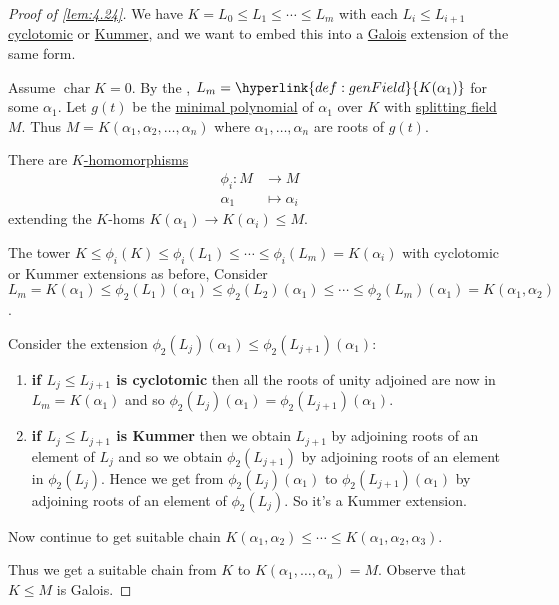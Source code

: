 \documentclass{article}
\DeclareMathOperator{\chara}{char}
\begin{document}
\begin{proof}[Proof of \cref{lem:4.24}]
    We have $K = L_0 \leq L_1 \leq \dotsb \leq L_m$ with each $L_i \leq L_{i+1}$ \hyperlink{def:cycloExt}{cyclotomic} or \hyperlink{def:kummerExt}{Kummer},
    and we want to embed this into a \hyperlink{def:galoisExt}{Galois} extension of the same form.

    Assume $\chara K = 0$. By the , $L_m = \hyperlink{def:genField}{K(\alpha_1)}$ for some $\alpha_1$.
    Let $g(t)$ be the \hyperlink{def:minimalPoly}{minimal polynomial} of $\alpha_1$ over $K$ with \hyperlink{def:splitting}{splitting field} $M$.
    Thus $M = K(\alpha_1,\alpha_2,\dotsc,\alpha_n)$ where $\alpha_1, \dotsc, \alpha_n$ are roots of $g(t)$.

    There are \hyperlink{def:homo}{$K$-homomorphisms}
    \begin{align*}
        \phi_i : M &\longrightarrow M \\
        \alpha_1 &\longmapsto \alpha_i
    \end{align*}
    extending the $K$-homs $K(\alpha_1) \to K(\alpha_i) \leq M$.

    The tower $K \leq \phi_i(K) \leq \phi_i(L_1) \leq \dotsb \leq \phi_i(L_m) = K(\alpha_i)$ with cyclotomic or Kummer extensions as before,
    Consider $L_m = K(\alpha_1) \leq \phi_2(L_1)(\alpha_1) \leq \phi_2(L_2)(\alpha_1) \leq \dotsb \leq \phi_2(L_m)(\alpha_1) = K(\alpha_1,\alpha_2)$.

    Consider the extension $\phi_2(L_j)(\alpha_1) \leq \phi_2(L_{j+1})(\alpha_1)$:
    \begin{enumerate}[label={}]
        \item \textbf{if $L_j \leq L_{j+1}$ is cyclotomic} then all the roots of unity adjoined are now in $L_m = K(\alpha_1)$ and so $\phi_2(L_j)(\alpha_1) = \phi_2(L_{j+1})(\alpha_1)$.
        \item \textbf{if $L_j \leq L_{j+1}$ is Kummer} then we obtain $L_{j+1}$ by adjoining roots of an element of $L_j$ and so we obtain $\phi_2(L_{j+1})$ by adjoining roots of an element in $\phi_2(L_j)$.
            Hence we get from $\phi_2(L_j)(\alpha_1)$ to $\phi_2(L_{j+1})(\alpha_1)$ by adjoining roots of an element of $\phi_2(L_j)$. So it's a Kummer extension.
    \end{enumerate}

    Now continue to get suitable chain $K(\alpha_1,\alpha_2) \leq \dotsb \leq K(\alpha_1, \alpha_2, \alpha_3)$.

    Thus we get a suitable chain from $K$ to $K(\alpha_1, \dotsc, \alpha_n) = M$.
    Observe that $K \leq M$ is Galois.
\end{proof}
\end{document}
